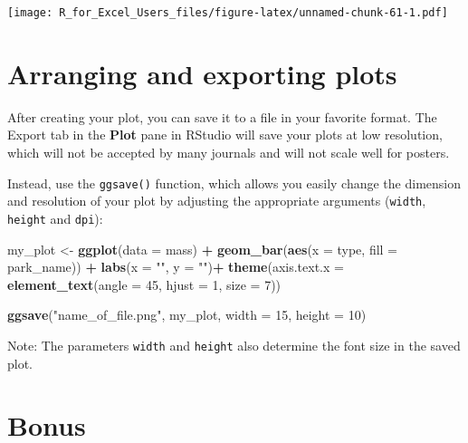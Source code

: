\documentclass[]{book}
\newenvironment{Shaded}{\begin{snugshade}}{\end{snugshade}}
\newcommand{\DataTypeTok}[1]{\textcolor[rgb]{0.13,0.29,0.53}{#1}}
\newcommand{\DecValTok}[1]{\textcolor[rgb]{0.00,0.00,0.81}{#1}}
\newcommand{\KeywordTok}[1]{\textcolor[rgb]{0.13,0.29,0.53}{\textbf{#1}}}
\newcommand{\NormalTok}[1]{#1}
\newcommand{\OperatorTok}[1]{\textcolor[rgb]{0.81,0.36,0.00}{\textbf{#1}}}
\newcommand{\StringTok}[1]{\textcolor[rgb]{0.31,0.60,0.02}{#1}}
\begin{document}
\texttt{[image: R\_for\_Excel\_Users\_files/figure-latex/unnamed-chunk-61-1.pdf]}

\hypertarget{arranging-and-exporting-plots}{%
\section{Arranging and exporting plots}\label{arranging-and-exporting-plots}}

After creating your plot, you can save it to a file in your favorite format. The Export tab in the \textbf{Plot} pane in RStudio will save your plots at low resolution, which will not be accepted by many journals and will not scale well for posters.

Instead, use the \texttt{ggsave()} function, which allows you easily change the dimension and resolution of your plot by adjusting the appropriate arguments (\texttt{width}, \texttt{height} and \texttt{dpi}):

\begin{Shaded}
\begin{Highlighting}[]
\NormalTok{my_plot <-}\StringTok{ }\KeywordTok{ggplot}\NormalTok{(}\DataTypeTok{data =}\NormalTok{ mass) }\OperatorTok{+}\StringTok{ }
\StringTok{      }\KeywordTok{geom_bar}\NormalTok{(}\KeywordTok{aes}\NormalTok{(}\DataTypeTok{x =}\NormalTok{ type, }\DataTypeTok{fill =}\NormalTok{ park_name)) }\OperatorTok{+}
\StringTok{  }\KeywordTok{labs}\NormalTok{(}\DataTypeTok{x =} \StringTok{""}\NormalTok{,}
       \DataTypeTok{y =} \StringTok{""}\NormalTok{)}\OperatorTok{+}
\StringTok{  }\KeywordTok{theme}\NormalTok{(}\DataTypeTok{axis.text.x =} \KeywordTok{element_text}\NormalTok{(}\DataTypeTok{angle =} \DecValTok{45}\NormalTok{, }\DataTypeTok{hjust =} \DecValTok{1}\NormalTok{, }\DataTypeTok{size =} \DecValTok{7}\NormalTok{))}

\KeywordTok{ggsave}\NormalTok{(}\StringTok{"name_of_file.png"}\NormalTok{, my_plot, }\DataTypeTok{width =} \DecValTok{15}\NormalTok{, }\DataTypeTok{height =} \DecValTok{10}\NormalTok{)}
\end{Highlighting}
\end{Shaded}

Note: The parameters \texttt{width} and \texttt{height} also determine the font size in the saved plot.

\hypertarget{bonus}{%
\section{Bonus}\label{bonus}}
\end{document}

